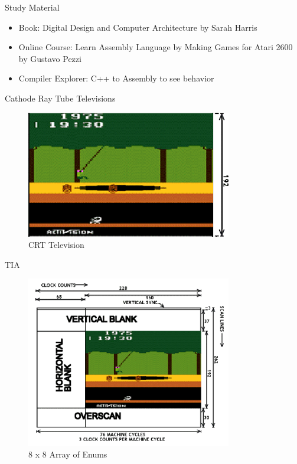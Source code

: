 \documentclass{beamer}
\begin{document}
\begin{frame}{Study Material}
  \begin{itemize}
    \item Book: Digital Design and Computer Architecture by Sarah Harris
    \item Online Course: Learn Assembly Language by Making Games for Atari 2600 by Gustavo Pezzi
    \item Compiler Explorer: C++ to Assembly to see behavior
  \end{itemize}

\end{frame}



\begin{frame}{Cathode Ray Tube Televisions}
    \begin{figure}
        \centering
        \includegraphics[width=0.8\textwidth]{monitor.png} %

        \caption{CRT Television}
    \end{figure}
\end{frame}


\begin{frame}{TIA}
    \begin{figure}
        \centering
        \includegraphics[width=0.8\textwidth]{screen_whole.png} %

        \caption{8 x 8 Array of Enums}
    \end{figure}
\end{frame}
\end{document}
